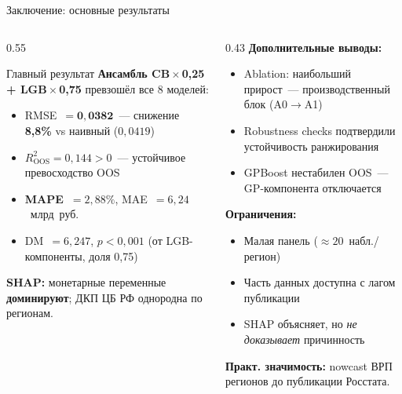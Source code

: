 \documentclass[aspectratio=169,10pt]{beamer}
\begin{document}
\begin{frame}{Заключение: основные результаты}
\begin{columns}[T]
  \begin{column}{0.55\textwidth}
    \begin{block}{Главный результат}
      \textbf{Ансамбль CB$\!\times\!$0,25 + LGB$\!\times\!$0,75} превзошёл все 8 моделей:
      \begin{itemize}
        \item RMSE~$= \mathbf{0{,}0382}$~---
              снижение \textbf{8,8\%} vs наивный ($0{,}0419$)
        \item $R^2_{\text{OOS}} = 0{,}144 > 0$~---
              устойчивое превосходство OOS
        \item \textbf{MAPE~$= 2{,}88\%$}, MAE~$= 6{,}24$~млрд~руб.
        \item DM~$= 6{,}247$, $p<0{,}001$ (от LGB-компоненты, доля 0,75)
      \end{itemize}
    \end{block}
    \vspace{0.15em}
    {\footnotesize\color{hsedark}\textbf{SHAP:} монетарные переменные \textbf{доминируют}; ДКП ЦБ РФ однородна по регионам.}
  \end{column}
  \begin{column}{0.43\textwidth}
    \textbf{\color{hsedark}Дополнительные выводы:}
    \begin{itemize}\setlength{\itemsep}{0pt}
      \small
      \item Ablation: наибольший прирост~--- производственный блок (A0$\to$A1)
      \item Robustness checks подтвердили устойчивость ранжирования
      \item GPBoost нестабилен OOS~--- GP-компонента отключается
    \end{itemize}
    \vspace{0.05em}
    \textbf{\color{hsedark}Ограничения:}
    \begin{itemize}\setlength{\itemsep}{0pt}
      \small
      \item Малая панель ($\approx\!20$~набл./регион)
      \item Часть данных доступна с лагом публикации
      \item SHAP объясняет, но \textit{не доказывает} причинность
    \end{itemize}
    \vspace{0.05em}
    {\footnotesize\textbf{\color{hsedark}Практ. значимость:} nowcast ВРП регионов до публикации Росстата.}
  \end{column}
\end{columns}
\end{frame}
\end{document}
